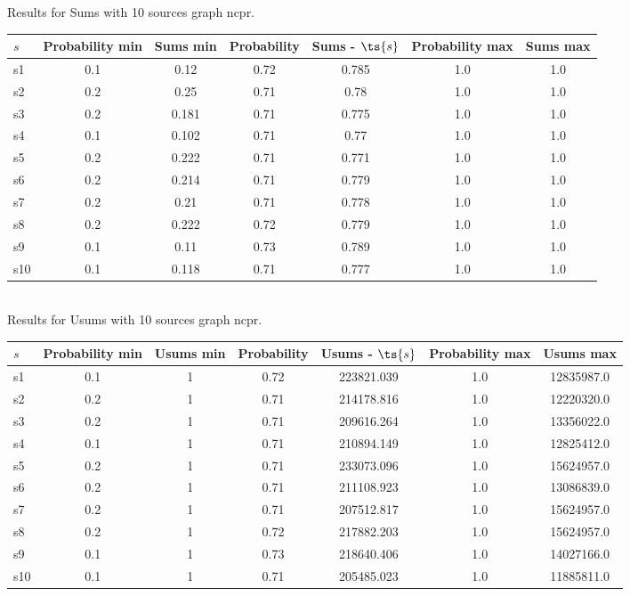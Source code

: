 \documentclass{article}
\begin{document}
\noindent Results for Sums with 10 sources graph ncpr.

\noindent\begin{tabular}{|l|c|c|c|c|c|c|}
\hline
$s$& Probability min & Sums min & Probability & Sums - $\ts{s}$ & Probability max & Sums max\\
\hline
s1 &0.1 & 0.12 & 0.72 & 0.785 & 1.0 & 1.0\\
\hline
s2 &0.2 & 0.25 & 0.71 & 0.78 & 1.0 & 1.0\\
\hline
s3 &0.2 & 0.181 & 0.71 & 0.775 & 1.0 & 1.0\\
\hline
s4 &0.1 & 0.102 & 0.71 & 0.77 & 1.0 & 1.0\\
\hline
s5 &0.2 & 0.222 & 0.71 & 0.771 & 1.0 & 1.0\\
\hline
s6 &0.2 & 0.214 & 0.71 & 0.779 & 1.0 & 1.0\\
\hline
s7 &0.2 & 0.21 & 0.71 & 0.778 & 1.0 & 1.0\\
\hline
s8 &0.2 & 0.222 & 0.72 & 0.779 & 1.0 & 1.0\\
\hline
s9 &0.1 & 0.11 & 0.73 & 0.789 & 1.0 & 1.0\\
\hline
s10 &0.1 & 0.118 & 0.71 & 0.777 & 1.0 & 1.0\\
\hline
\end{tabular}\\

\noindent Results for Usums with 10 sources graph ncpr.

\noindent\begin{tabular}{|l|c|c|c|c|c|c|}
\hline
$s$& Probability min & Usums min & Probability & Usums - $\ts{s}$ & Probability max & Usums max\\
\hline
s1 &0.1 & 1 & 0.72 & 223821.039 & 1.0 & 12835987.0\\
\hline
s2 &0.2 & 1 & 0.71 & 214178.816 & 1.0 & 12220320.0\\
\hline
s3 &0.2 & 1 & 0.71 & 209616.264 & 1.0 & 13356022.0\\
\hline
s4 &0.1 & 1 & 0.71 & 210894.149 & 1.0 & 12825412.0\\
\hline
s5 &0.2 & 1 & 0.71 & 233073.096 & 1.0 & 15624957.0\\
\hline
s6 &0.2 & 1 & 0.71 & 211108.923 & 1.0 & 13086839.0\\
\hline
s7 &0.2 & 1 & 0.71 & 207512.817 & 1.0 & 15624957.0\\
\hline
s8 &0.2 & 1 & 0.72 & 217882.203 & 1.0 & 15624957.0\\
\hline
s9 &0.1 & 1 & 0.73 & 218640.406 & 1.0 & 14027166.0\\
\hline
s10 &0.1 & 1 & 0.71 & 205485.023 & 1.0 & 11885811.0\\
\hline
\end{tabular}\\
\end{document}
